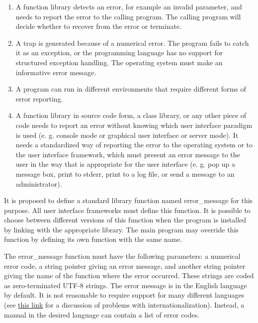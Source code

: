 \documentclass[forwardcom.tex]{subfiles}
\begin{document}
\begin{enumerate}
\item A function library detects an error, for example an invalid parameter, and needs to report the error to the calling program. The calling program will decide whether to recover from the error or terminate. 

\item A trap is generated because of a numerical error. The program fails to catch it as an exception, or the programming language has no support for structured exception handling. The operating system must make an informative error message. 

\item A program can run in different environments that require different forms of error reporting. 

\item A function library in source code form, a class library, or any other piece of code needs to report an error without knowing which user interface paradigm is used (e. g. console mode or graphical user interface or server mode). It needs a standardized way of reporting the error to the operating system or to the user interface framework, which must present an error 
message to the user in the way that is appropriate for the user interface (e. g. pop up a message box, print to stderr, print to a log file, or send a message to an administrator).
\end{enumerate}

\label{errorReportFunction}
It is proposed to define a standard library function named error\_message for this purpose. All user interface frameworks must define this function. It is possible to choose between different versions of this function when the program is installed by linking with the appropriate library. The main program may override this function by defining its own function with the same name. 
\vspace{2mm}

The error\_message function must have the following parameters: a numerical error code, a string pointer giving an error message, and another string pointer giving the name of the function where the error occurred. These strings are coded as zero-terminated UTF-8 strings. 
The error message is in the English language by default. It is not reasonable to require support for many different languages (see 
\href{https://en.wikibooks.org/wiki/Usability_for_Nerds/Software/Internationalization}{this link} for a discussion of problems with internationalization). Instead, a manual in the desired language can contain a list of error codes. 
\vspace{2mm}
\end{document}
